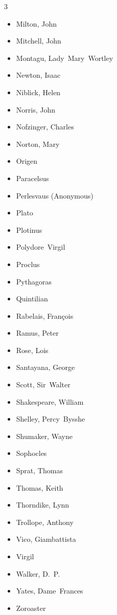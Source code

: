 \documentclass[10pt,makeidx]{extreport}
\begin{document}
\begin{multicols}{3}
\begin{itemize}
  \item Milton, John
  \item Mitchell, John
  \item Montagu, Lady~Mary~Wortley
  \item Newton, Isaac
  \item Niblick, Helen
  \item Norris, John
  \item Nofzinger, Charles
  \item Norton, Mary
  \item Origen
  \item Paracelsus
  \item Perlesvaus (Anonymous)
  \item Plato
  \item Plotinus
  \item Polydore~Virgil
  \item Proclus
  \item Pythagoras
  \item Quintilian
  \item Rabelais, François
  \item Ramus, Peter
  \item Rose, Lois
  \item Santayana, George
  \item Scott, Sir~Walter
  \item Shakespeare, William
  \item Shelley, Percy~Bysshe
  \item Shumaker, Wayne
  \item Sophocles
  \item Sprat, Thomas
  \item Thomas, Keith
  \item Thorndike, Lynn
  \item Trollope, Anthony
  \item Vico, Giambattista
  \item Virgil
  \item Walker, D.~P.
  \item Yates, Dame~Frances
  \item Zoroaster
\end{itemize}
\end{multicols}
\end{document}
